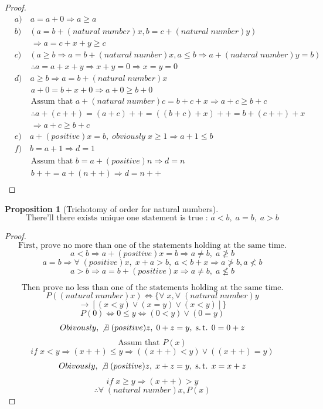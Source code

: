 \documentclass[a4paper]{report}
\theoremstyle{definition}
\newtheorem{proposition}{Proposition}[definition]
\newcommand{\nn}{(natural\;number)}
\newcommand{\at}{\text{Assum that }}
\newcommand{\exforall}{\forall\;}
\newcommand{\st}{,\;\operatorname{s.t.}\;}
\newcommand{\exexists}{\exists\;}
\begin{document}
\begin{proof}
    $$\begin{aligned}
        &a)\quad a=a+0\Rightarrow a\geq a\\
        &b)\quad (a=b+\nn x,b=c+\nn y)\\
        &\qquad \Rightarrow a=c+x+y\geq c\\
        &c)\quad (a\geq b\Rightarrow a=b+\nn x,a\leq b\Rightarrow a+\nn y=b)\\
        &\qquad\therefore a=a+x+y\Rightarrow x+y=0\Rightarrow x=y=0\\
        &d)\quad a\geq b\Rightarrow a=b+\nn x\\
        &\qquad a+0=b+x+0\Rightarrow a+0\geq b+0\\
        &\qquad \at a+\nn c=b+c+x\Rightarrow a+c\geq b+c\\
        &\qquad \therefore a+(c++)=(a+c)++=((b+c)+x)++=b+(c++)+x\\
        &\qquad \Rightarrow a+c\geq b+c\\
        &e)\quad a+(positive)x=b,\;obviously\;x\geq1\Rightarrow a+1\leq b\\
        &f)\quad b=a+1\Rightarrow d=1\\
        &\qquad\at b=a+(positive)n\Rightarrow d=n\\
        &\qquad b++=a+(n++)\Rightarrow d=n++\\
    \end{aligned}$$
\end{proof}
\begin{proposition}[Trichotomy of order for natural numbers]
    $$\text{There'll there exists unique one statement is true : }a<b,\;a=b,\;a>b$$
\end{proposition}
\begin{proof}
    $$\text{First, prove no more than one of the statements holding at the same time.}$$
    $$a<b\Rightarrow a+(positive)x=b\Rightarrow a\neq b,\;a\not\geq b$$
    $$a=b\Rightarrow \exforall(positive)x,\;x+a>b,\;a<b+x\Rightarrow a\not>b,a\not<b$$
    $$a>b\Rightarrow a=b+(positive)x\Rightarrow a\neq b,\;a\not\leq b$$

    $$\text{Then prove no less than one of the statements holding at the same time.}$$
    $$P(\nn x)\Leftrightarrow\{\exforall x,\exforall \nn y$$
    $$\rightarrow[(x<y)\vee(x=y)\vee(x<y)]\}$$
    $$P(0)\Leftrightarrow 0\leq y\Leftrightarrow(0<y)\vee(0=y)$$
    $$Obivously,\;\not\exexists(positive)z,\;0+z=y\st 0=0+z$$
    $$\at P(x)$$
    $$if\;x<y\Rightarrow (x++)\leq y\Rightarrow((x++)<y)\vee((x++)=y)$$
    $$Obivously,\;\not\exexists(positive)z,\;x+z=y\st x=x+z$$
    $$if\;x\geq y\Rightarrow (x++)>y$$
    $$\therefore \exforall\nn x,P(x)$$
\end{proof}
\end{document}
